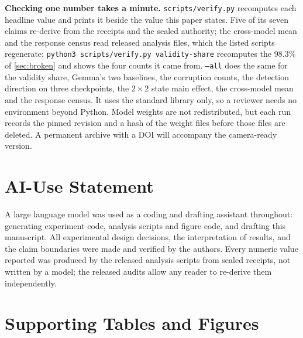 \documentclass[10pt,twocolumn]{article}
\begin{document}
\textbf{Checking one number takes a minute.} \texttt{scripts/verify.py} recomputes each headline value and prints it beside the
value this paper states. Five of its seven claims re-derive from the receipts and
the sealed authority; the cross-model mean and the response census read released
analysis files, which the listed scripts regenerate:
\texttt{python3 scripts/verify.py validity-share} recomputes the $98.3\%$ of
\cref{sec:broken} and shows the four counts it came from.
\texttt{--all} does the same for the validity share, Gemma's two baselines, the
corruption counts, the detection direction on three checkpoints, the $2\times2$
state main effect, the cross-model mean and the response census. It uses the
standard library only, so a reviewer needs no environment beyond Python. Model weights are not redistributed, but each run records the
pinned revision and a hash of the weight files before those files are deleted. A
permanent archive with a DOI will accompany the camera-ready version.

\section*{AI-Use Statement}

A large language model was used as a coding and drafting assistant throughout:
generating experiment code, analysis scripts and figure code, and drafting this
manuscript. All experimental design decisions, the interpretation of results,
and the claim boundaries were made and verified by the authors. Every numeric
value reported was produced by the released analysis scripts from sealed
receipts, not written by a model; the released audits allow any reader to
re-derive them independently.





\appendix
\section{Supporting Tables and Figures}
\end{document}
